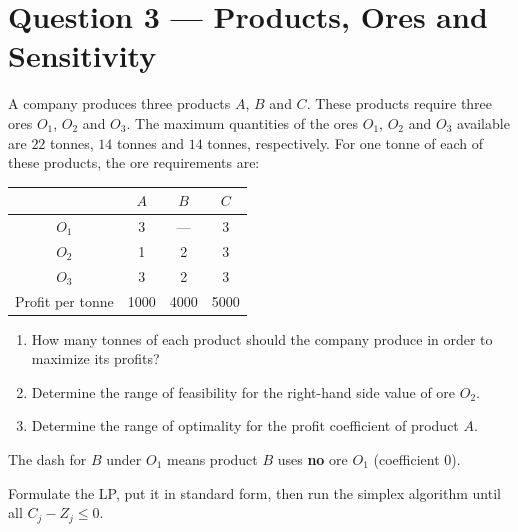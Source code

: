 \section{Question 3 --- Products, Ores and Sensitivity}

\begin{questionbox}
A company produces three products \(A\), \(B\) and \(C\). These products require three ores
\(O_1\), \(O_2\) and \(O_3\). The maximum quantities of the ores \(O_1\), \(O_2\) and \(O_3\)
available are \(22\) tonnes, \(14\) tonnes and \(14\) tonnes, respectively. For one tonne of
each of these products, the ore requirements are:

\begin{center}
\begin{tabular}{c|ccc}
 & \(A\) & \(B\) & \(C\) \\
\hline
\(O_1\) & 3 & --- & 3 \\
\(O_2\) & 1 & 2 & 3 \\
\(O_3\) & 3 & 2 & 3 \\
\hline
Profit per tonne & 1000 & 4000 & 5000 \\
\end{tabular}
\end{center}

\begin{enumerate}
  \item[(a)] How many tonnes of each product should the company produce in order to
        maximize its profits?
  \item[(b)] Determine the range of feasibility for the right-hand side value of ore \(O_2\).
  \item[(c)] Determine the range of optimality for the profit coefficient of product \(A\).
\end{enumerate}
\end{questionbox}

\begin{notebox}
The dash for \(B\) under \(O_1\) means product \(B\) uses \textbf{no} ore \(O_1\)
(coefficient \(0\)).
\end{notebox}


\begin{ideabox}
Formulate the LP, put it in standard form, then run the simplex algorithm until all
\(C_j-Z_j\le 0\).
\end{ideabox}

